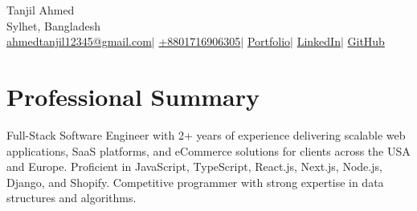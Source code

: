 \documentclass[10pt,letterpaper]{article}
\newcommand{\sep}{\enspace$|$\enspace}
\begin{document}
\raggedright

\begin{center}
  \makebox[0pt][l]{\hspace{0.39\textwidth}\raisebox{12pt}{\small\textit{\textcolor{muted}{Last updated in November 2026}}}}%
  {\fontsize{25}{28}\selectfont Tanjil Ahmed}\\[5pt]
  Sylhet, Bangladesh\\[4pt]
  \href{mailto:ahmedtanjil12345@gmail.com}{ahmedtanjil12345@gmail.com}\sep
  \href{tel:+8801716906305}{+8801716906305}\sep
  \href{https://tanjilahmed.vercel.app}{Portfolio}\sep
  \href{https://www.linkedin.com/in/tanjilahmed01/}{LinkedIn}\sep
  \href{https://github.com/tanjilahmed12345}{GitHub}
\end{center}
\vspace{-6pt}

\section{Professional Summary}
Full-Stack Software Engineer with 2+ years of experience delivering scalable web applications, SaaS platforms, and
eCommerce solutions for clients across the USA and Europe. Proficient in JavaScript, TypeScript, React.js, Next.js,
Node.js, Django, and Shopify. Competitive programmer with strong expertise in data structures and algorithms.

\end{document}
